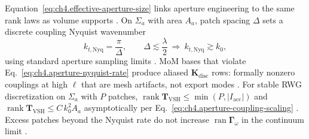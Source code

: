 Equation~\eqref{eq:ch4.effective-aperture-size} links aperture engineering to the same rank laws as volume supports
\cite{hansen1988}.
On \(\Sigma_{a}\) with area \(A_{a}\), patch spacing \(\Delta\) sets a discrete coupling Nyquist wavenumber
\begin{equation}
\label{eq:ch4.aperture-nyquist-rate}
k_{t,\mathrm{Nyq}}
=
\frac{\pi}{\Delta},
\qquad
\Delta\lesssim\frac{\lambda}{2}
\ \Longrightarrow\
k_{t,\mathrm{Nyq}}\gtrsim k_{0},
\end{equation}
using standard aperture sampling limits \cite{collin2001}. MoM bases that violate
Eq.~\eqref{eq:ch4.aperture-nyquist-rate} produce aliased \(\mathbf{K}_{\mathrm{disc}}\) rows: formally nonzero couplings
at high \(\ell\) that are mesh artifacts, not export modes \cite{devaney2004}.
\phantomsection\label{prop:ch4.aperture-mom-rank}
For stable RWG discretization on \(\Sigma_{a}\) with \(P\) patches,
\(\operatorname{rank}\mathbf{T}_{\mathrm{VSH}}\le\min(P,|I_{\mathrm{acc}}|)\) and
\(\operatorname{rank}\mathbf{T}_{\mathrm{VSH}}\le C\,k_{0}^{2}A_{a}\) asymptotically per
Eq.~\eqref{eq:ch4.aperture-coupling-scaling} \cite{harrington2001}. Excess patches beyond the
Nyquist rate do not increase \(\operatorname{ran}\boldsymbol{\Gamma}_\omega\) in the continuum limit
\cite{stratton1941}.
